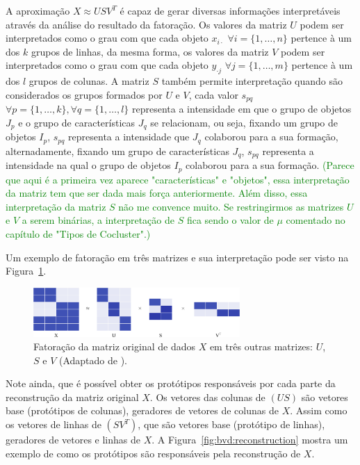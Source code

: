 \documentclass[
    12pt,                %
    oneside,            %
    a4paper,            %
    english,            %
    brazil                %
    ]{abntex2ppgsi}
\begin{document}
A aproximação $X \approx USV^T$ é capaz de gerar diversas informações interpretáveis através da análise do resultado da fatoração.
Os valores da matriz $U$ podem ser interpretados como o grau com que cada objeto $x_{i \cdot}$ $\forall i = \{1, \dots, n\}$ pertence à um dos $k$ grupos de linhas, da mesma forma, os valores da matriz $V$ podem ser interpretados como o grau com que cada objeto $y_{\cdot j}$ $\forall j = \{1, \dots, m\}$ pertence à um dos $l$ grupos de colunas.
A matriz $S$ também permite interpretação quando são considerados os grupos formados por $U$ e $V$, cada valor $s_{pq}$ $\forall p = \{1, \dots, k\}, \forall q = \{1, \dots, l\}$ representa a intensidade em que o grupo de objetos $J_p$ e o grupo de características $J_q$ se relacionam, ou seja, fixando um grupo de objetos $I_p$, $s_{pq}$ representa a intensidade que $J_q$ colaborou para a sua formação, alternadamente, fixando um grupo de características $J_q$, $s_{pq}$ representa a intensidade na qual o grupo de objetos $I_p$ colaborou para a sua formação. \textcolor{green}{(Parece que aqui é a primeira vez aparece "características" e "objetos", essa interpretação da matriz tem que ser dada mais força anteriormente. Além disso, essa interpretação da matriz $S$ não me convence muito. Se restringirmos as matrizes $U$ e $V$ a serem binárias, a interpretação de $S$ fica sendo o valor de $\mu$ comentado no capítulo de "Tipos de Cocluster".)}

Um exemplo de fatoração em três matrizes e sua interpretação pode ser visto na Figura~\ref{fig:bvd}.

\begin{figure}[H]
\centering
    \includegraphics[width=0.7\textwidth]{img/factorizationXUSV.png}
    \caption{
        Fatoração da matriz original de dados $X$ em três outras matrizes: $U$, $S$ e $V$ (Adaptado de ).
    }
    \label{fig:bvd}
\end{figure}

Note ainda, que é possível obter os protótipos responsáveis por cada parte da reconstrução da matriz original $X$.
Os vetores das colunas de $(US)$ são vetores base (protótipos de colunas), geradores de vetores de colunas de $X$.
Assim como os vetores de linhas de $(SV^T)$, que são vetores base (protótipo de linhas), geradores de vetores e linhas de $X$.
A Figura~\ref{fig:bvd:reconstruction} mostra um exemplo de como os protótipos são responsáveis pela reconstrução de $X$.
\end{document}
